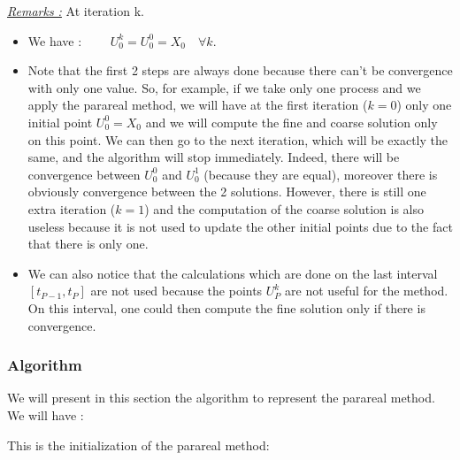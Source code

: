 \noindent \underline{\textit{Remarks :}} At iteration k.
\begin{itemize}[label=-]
	\item We have : $\qquad U_0^k=U_0^0=X_0 \quad \forall k$.
	\item Note that the first 2 steps are always done because there can't be convergence with only one value. So, for example, if we take only one process and we apply the parareal method, we will have at the first iteration ($k=0$) only one initial point $U_0^0=X_0$ and we will compute the fine and coarse solution only on this point. We can then go to the next iteration, which will be exactly the same, and the algorithm will stop immediately. Indeed, there will be convergence between $U_0^0$ and $U_0^1$ (because they are equal), moreover there is obviously convergence between the 2 solutions. However, there is still one extra iteration ($k=1$) and the computation of the coarse solution is also useless because it is not used to update the other initial points due to the fact that there is only one.
	\item We can also notice that the calculations which are done on the last interval $[t_{P-1},t_P]$ are not used because the points $U_P^k$ are not useful for the method. On this interval, one could then compute the fine solution only if there is convergence.
\end{itemize}

\subsubsection{Algorithm}

\IncMargin{1em}

\noindent We will present in this section the algorithm to represent the parareal method. We will have :

\begin{algorithm*}
	
\end{algorithm*}\DecMargin{1em}

\noindent This is the initialization of the parareal method:

